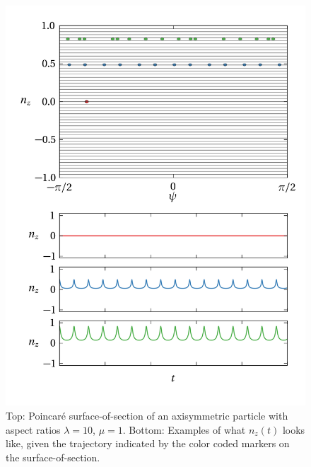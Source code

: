 \documentclass[thesis.tex]{subfiles}
\begin{document}
\begin{figure}
\includegraphics[width=12cm]{figs/poincareA.png}%
\caption{\label{fig:poincareA} Top: Poincar\'e surface-of-section of an axisymmetric particle with aspect ratios $\lambda=10$, $\mu=1$. Bottom: Examples of what $n_z(t)$ looks like, given the trajectory indicated by the color coded markers on the surface-of-section.}%
\end{figure}
\end{document}
